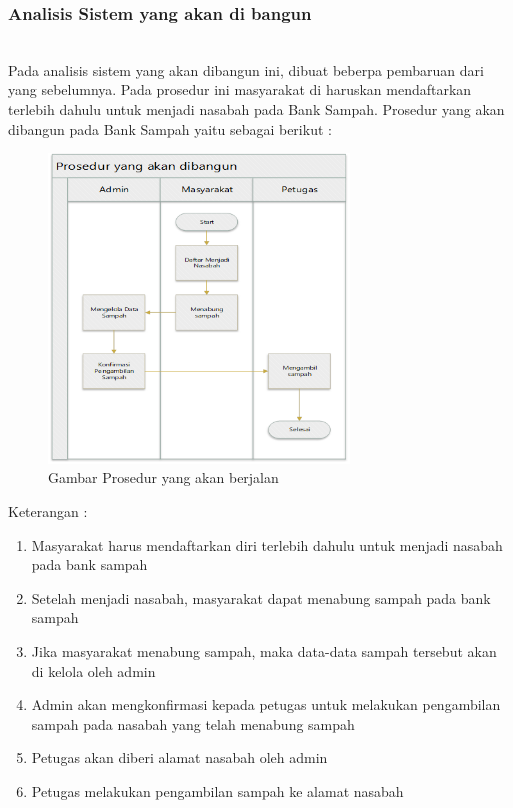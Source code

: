 \subsubsection{Analisis Sistem yang akan di bangun}
\hfill\\
Pada analisis sistem yang akan dibangun ini, dibuat beberpa pembaruan dari yang  sebelumnya. Pada prosedur ini masyarakat di haruskan mendaftarkan terlebih dahulu untuk menjadi nasabah pada Bank Sampah. Prosedur yang akan dibangun pada Bank Sampah yaitu sebagai berikut :
	\begin{figure}[H]
		\includegraphics[width=8cm]{figures/analisis/2.png}
		\centering
		\caption{Gambar Prosedur yang akan berjalan}
	\end{figure}
Keterangan :
\begin{enumerate}
	\item Masyarakat harus mendaftarkan diri terlebih dahulu untuk menjadi nasabah pada bank sampah
	\item Setelah menjadi nasabah, masyarakat dapat menabung sampah pada bank sampah
	\item Jika masyarakat menabung sampah, maka data-data sampah tersebut akan di kelola oleh admin 
	\item Admin akan mengkonfirmasi kepada petugas untuk melakukan pengambilan sampah pada nasabah yang telah menabung sampah
	\item Petugas akan diberi alamat nasabah oleh admin
	\item Petugas melakukan pengambilan sampah ke alamat nasabah
\end{enumerate}

